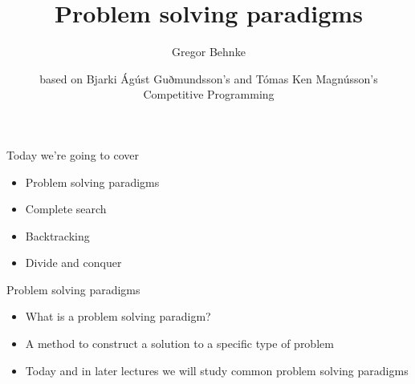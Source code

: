\documentclass[12pt,t]{beamer}
\title{Problem solving paradigms}
\author{Gregor Behnke}
\institute{Institute of Artificial Intelligence\\ Ulm University}
\date{\tiny based on Bjarki Ágúst Guðmundsson's and Tómas Ken Magnússon's\\Competitive Programming}
\newcommand{\bi}{\begin{itemize}}
\newcommand{\ei}{\end{itemize}}
\begin{document}
{
    \frame{
        \titlepage
    }
}


\begin{frame}{Today we're going to cover}
    \vspace{40pt}
    \bi
        \item Problem solving paradigms
        \item Complete search
        \item Backtracking
        \item Divide and conquer
    \ei
\end{frame}


\begin{frame}{Problem solving paradigms}
    \vspace{40pt}
    \bi
        \item What is a problem solving paradigm?
        \item A method to construct a solution to a specific type of problem
        \item Today and in later lectures we will study common problem solving paradigms
    \ei
\end{frame}

\end{document}
